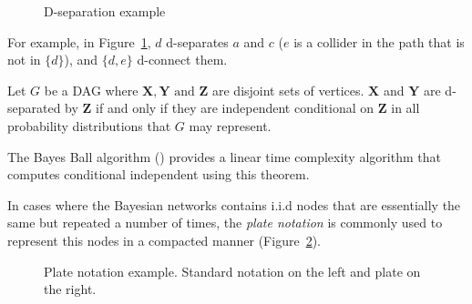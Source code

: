 \begin{figure}[t]
\centering
{}
\caption{D-separation example}\label{fig:d-sep}
\end{figure}

For example, in Figure~\ref{fig:d-sep}, \(d\) d-separates \(a\) and \(c\) (\(e\)
is a collider in the path that is not in \(\{d\}\)),
and \(\{d,e\}\) d-connect them.

\begin{theorem}\label{th:d-separation}
Let \(G\) be a DAG where \(\bm{X}, \bm{Y} \text{ and } \bm{Z}\)
are disjoint sets of vertices. \(\bm{X}\) and \(\bm{Y}\)
are d-separated by \(\bm{Z}\) if and only if they are independent conditional
on \(\bm{Z}\) in all probability distributions that \(G\) may represent.
\end{theorem}

The Bayes Ball algorithm (\cite{bayes_ball}) provides a linear time complexity
algorithm that computes conditional independent using this theorem.


In cases where the Bayesian networks contains i.i.d nodes that are
essentially the same but repeated a number of times, the \emph{plate notation} is commonly used to represent this nodes in a compacted manner (Figure~\ref{fig:plate_notation}).

\begin{figure}[t]
\centering
{}
\caption{Plate notation example. Standard notation on the left and plate on the right.}\label{fig:plate_notation}
\end{figure}


